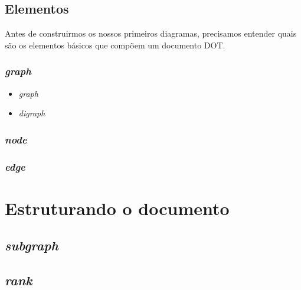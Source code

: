 \documentclass[a4paper,12pt]{article}
\begin{document}
    \subsection{Elementos}
      Antes de construirmos os nossos primeiros diagramas,
      precisamos entender quais são os elementos básicos
      que compõem um documento DOT.

      \subsubsection{\emph{graph}}

        \begin{itemize}

          \item{\emph{graph}}

          \item{\emph{digraph}}

        \end{itemize}

      \subsubsection{\emph{node}}

      \subsubsection{\emph{edge}}


  \section{Estruturando o documento}

    \subsection{\emph{subgraph}}

    \subsection{\emph{rank}}
\end{document}
